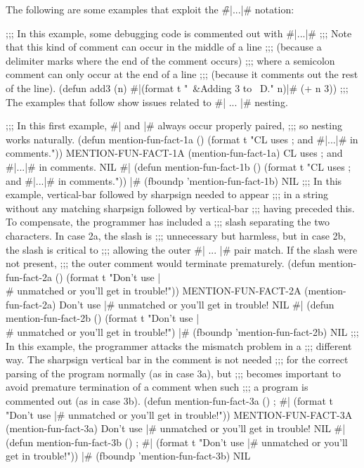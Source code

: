 
The following are some examples that exploit the \f{\#|...|\#} notation:

\code ;;; In this example, some debugging code is commented out with #|...|# ;;; Note that this kind of comment can occur in the middle of a line ;;; (because a delimiter marks where the end of the comment occurs) ;;; where a semicolon comment can only occur at the end of a line  ;;; (because it comments out the rest of the line).
 (defun add3 (n) #|(format t "~&Adding 3 to ~D." n)|# (+ n 3)) \goodbreak ;;; The examples that follow show issues related to #| ... |# nesting.

;;; In this first example, #| and |# always occur properly paired, ;;; so nesting works naturally.
 (defun mention-fun-fact-1a ()
   (format t "CL uses ; and #|...|# in comments.")) \EV MENTION-FUN-FACT-1A
 (mention-fun-fact-1a) \OUT CL uses ; and #|...|# in comments. \EV NIL
 #| (defun mention-fun-fact-1b ()
      (format t "CL uses ; and #|...|# in comments.")) |#
 (fboundp 'mention-fun-fact-1b) \EV NIL \goodbreak ;;; In this example, vertical-bar followed by sharpsign needed to appear ;;; in a string without any matching sharpsign followed by vertical-bar ;;; having preceded this.  To compensate, the programmer has included a ;;; slash separating the two characters.  In case 2a, the slash is  ;;; unnecessary but harmless, but in case 2b, the slash is critical to ;;; allowing the outer #| ... |# pair match.  If the slash were not present, ;;; the outer comment would terminate prematurely.
 (defun mention-fun-fact-2a ()
   (format t "Don't use |\\# unmatched or you'll get in trouble!")) \EV MENTION-FUN-FACT-2A
 (mention-fun-fact-2a) \OUT Don't use |# unmatched or you'll get in trouble! \EV NIL
 #| (defun mention-fun-fact-2b ()
      (format t "Don't use |\\# unmatched or you'll get in trouble!") |#
 (fboundp 'mention-fun-fact-2b) \EV NIL \goodbreak ;;; In this example, the programmer attacks the mismatch problem in a ;;; different way.  The sharpsign vertical bar in the comment is not needed ;;; for the correct parsing of the program normally (as in case 3a), but  ;;; becomes important to avoid premature termination of a comment when such  ;;; a program is commented out (as in case 3b).
 (defun mention-fun-fact-3a () ; #|
   (format t "Don't use |# unmatched or you'll get in trouble!")) \EV MENTION-FUN-FACT-3A
 (mention-fun-fact-3a) \OUT Don't use |# unmatched or you'll get in trouble! \EV NIL
 #|
 (defun mention-fun-fact-3b () ; #|
   (format t "Don't use |# unmatched or you'll get in trouble!"))
 |#
 (fboundp 'mention-fun-fact-3b) \EV NIL \endcode

